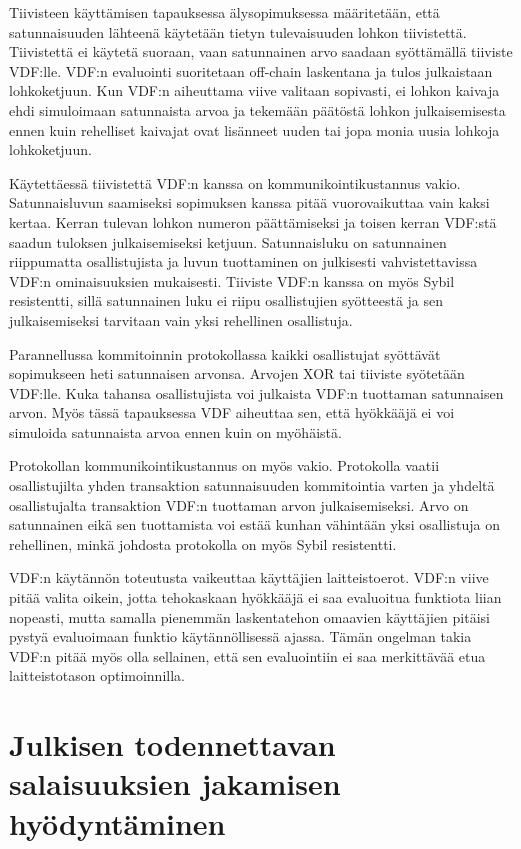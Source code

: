 Tiivisteen käyttämisen tapauksessa älysopimuksessa määritetään, että satunnaisuuden lähteenä käytetään tietyn tulevaisuuden lohkon tiivistettä. Tiivistettä ei käytetä suoraan, vaan satunnainen arvo saadaan syöttämällä tiiviste VDF:lle. VDF:n evaluointi suoritetaan off-chain laskentana ja tulos julkaistaan lohkoketjuun. Kun VDF:n aiheuttama viive valitaan sopivasti, ei lohkon kaivaja ehdi simuloimaan satunnaista arvoa ja tekemään päätöstä lohkon julkaisemisesta ennen kuin rehelliset kaivajat ovat lisänneet uuden tai jopa monia uusia lohkoja lohkoketjuun.

Käytettäessä tiivistettä VDF:n kanssa on kommunikointikustannus vakio. Satunnaisluvun saamiseksi sopimuksen kanssa pitää vuorovaikuttaa vain kaksi kertaa. Kerran tulevan lohkon numeron päättämiseksi ja toisen kerran VDF:stä saadun tuloksen julkaisemiseksi ketjuun. Satunnaisluku on satunnainen riippumatta osallistujista ja luvun tuottaminen on julkisesti vahvistettavissa VDF:n ominaisuuksien mukaisesti. Tiiviste VDF:n kanssa on myös Sybil resistentti, sillä satunnainen luku ei riipu osallistujien syötteestä ja sen julkaisemiseksi tarvitaan vain yksi rehellinen osallistuja.

Parannellussa kommitoinnin protokollassa kaikki osallistujat syöttävät sopimukseen heti satunnaisen arvonsa. Arvojen XOR tai tiiviste syötetään VDF:lle. Kuka tahansa osallistujista voi julkaista VDF:n tuottaman satunnaisen arvon. Myös tässä tapauksessa VDF aiheuttaa sen, että hyökkääjä ei voi simuloida satunnaista arvoa ennen kuin on myöhäistä. 

Protokollan kommunikointikustannus on myös vakio. Protokolla vaatii osallistujilta yhden transaktion satunnaisuuden kommitointia varten ja yhdeltä osallistujalta transaktion VDF:n tuottaman arvon julkaisemiseksi. Arvo on satunnainen eikä sen tuottamista voi estää kunhan vähintään yksi osallistuja on rehellinen, minkä johdosta protokolla on myös Sybil resistentti.

VDF:n käytännön toteutusta vaikeuttaa käyttäjien laitteistoerot. VDF:n viive pitää valita oikein, jotta tehokaskaan hyökkääjä ei saa evaluoitua funktiota liian nopeasti, mutta samalla pienemmän laskentatehon omaavien käyttäjien pitäisi pystyä evaluoimaan funktio käytännöllisessä ajassa. Tämän ongelman takia VDF:n pitää myös olla sellainen, että sen evaluointiin ei saa merkittävää etua laitteistotason optimoinnilla.

\section{Julkisen todennettavan salaisuuksien jakamisen hyödyntäminen}

